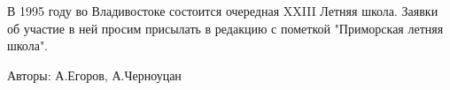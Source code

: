 \documentclass[9pt, a4paper]{article}
\begin{document}
\begin{footnotesize}
\begin{multicols}{3}
В 1995 году во Владивостоке состоится очередная XXIII Летняя школа. Заявки об участие в ней просим присылать в редакцию с пометкой "Приморская летняя школа".

Авторы: А.Егоров, А.Черноуцан

\end{multicols}
\end{footnotesize}
\end{document}
